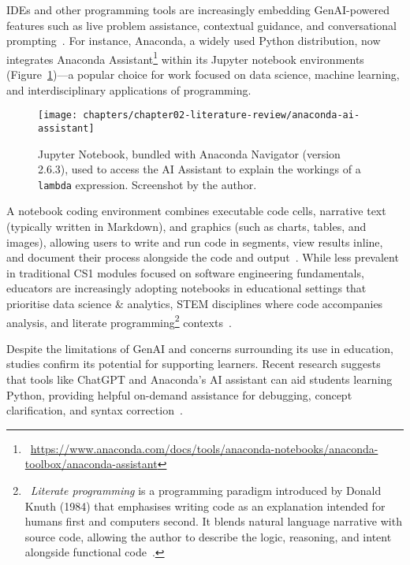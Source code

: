IDEs and other programming tools are increasingly embedding GenAI-powered features such as live problem assistance, contextual guidance, and conversational prompting~\cite{amiri_enhancing_2025, yang_enhancing_2024, zabala_development_2024}. For instance, Anaconda, a widely used Python distribution, now integrates Anaconda Assistant\footnote{~\url{https://www.anaconda.com/docs/tools/anaconda-notebooks/anaconda-toolbox/anaconda-assistant}} within its Jupyter notebook environments (Figure~\ref{fig:anaconda-ai-assistant})---a popular choice for work focused on data science, machine learning, and interdisciplinary applications of programming. 

\begin{figure}[htbp]
  \centering
  \texttt{[image: chapters/chapter02-literature-review/anaconda-ai-assistant]}
  \caption{Jupyter Notebook, bundled with Anaconda Navigator (version 2.6.3), used to access the AI Assistant to explain the workings of a \texttt{lambda} expression. Screenshot by the author.}
  \label{fig:anaconda-ai-assistant}
\end{figure}

A notebook coding environment combines executable code cells, narrative text (typically written in Markdown), and graphics (such as charts, tables, and images), allowing users to write and run code in segments, view results inline, and document their process alongside the code and output~\cite{vaughan_python_2023}. While less prevalent in traditional CS1 modules focused on software engineering fundamentals, educators are increasingly adopting notebooks in educational settings that prioritise data science \& analytics, STEM disciplines where code accompanies analysis, and literate programming\footnote{~\textit{Literate programming} is a programming paradigm introduced by Donald Knuth (1984) that emphasises writing code as an explanation intended for humans first and computers second. It blends natural language narrative with source code, allowing the author to describe the logic, reasoning, and intent alongside functional code~\cite{rule_ten_2019}.} contexts~\cite{bascunana_impact_2023, johnson_benefits_2020, yavuz_temel_using_2025}.

Despite the limitations of GenAI and concerns surrounding its use in education, studies confirm its potential for supporting learners. Recent research suggests that tools like ChatGPT and Anaconda's AI assistant can aid students learning Python, providing helpful on-demand assistance for debugging, concept clarification, and syntax correction~\cite{liu_teaching_2024, yang_enhancing_2024}. 


